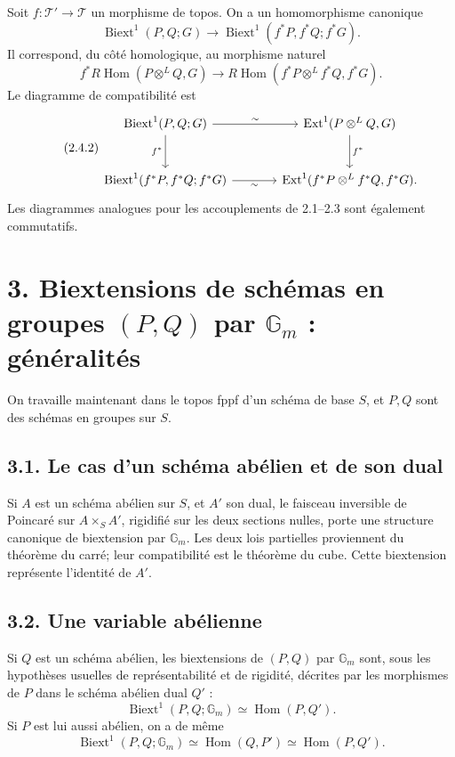 \documentclass[11pt]{article}
\providecommand{\Gm}{\mathbb G_m}
\providecommand{\Hom}{\operatorname{Hom}}
\providecommand{\Ext}{\operatorname{Ext}}
\providecommand{\Biext}{\operatorname{Biext}}
\providecommand{\T}{\mathcal T}
\begin{document}
Soit \(f:\T'\to\T\) un morphisme de topos.  On a un homomorphisme canonique
\begin{equation}\tag{2.4.1}
        \Biext^1(P,Q;G)\longrightarrow
        \Biext^1(f^*P,f^*Q;f^*G).
\end{equation}
Il correspond, du côté homologique, au morphisme naturel
\[
        f^*R\!\Hom(P\otimes^LQ,G)\to
        R\!\Hom(f^*P\otimes^Lf^*Q,f^*G).
\]
Le diagramme de compatibilité est
\begin{equation}\tag{2.4.2}
\begin{tikzcd}[column sep=large,row sep=large]
\Biext^1(P,Q;G)\arrow[r,"\sim"]\arrow[d,"f^*"']&\Ext^1(P\otimes^LQ,G)\arrow[d,"f^*"]\\
\Biext^1(f^*P,f^*Q;f^*G)\arrow[r,"\sim"']&\Ext^1(f^*P\otimes^Lf^*Q,f^*G).
\end{tikzcd}
\end{equation}
Les diagrammes analogues pour les accouplements de 2.1--2.3 sont également commutatifs.

\section*{3. Biextensions de schémas en groupes \((P,Q)\) par \(\Gm\) : généralités}

On travaille maintenant dans le topos fppf d'un schéma de base \(S\), et \(P,Q\) sont des schémas en groupes sur \(S\).

\subsection*{3.1. Le cas d'un schéma abélien et de son dual}

Si \(A\) est un schéma abélien sur \(S\), et \(A'\) son dual, le faisceau inversible de Poincaré sur \(A\times_SA'\), rigidifié sur les deux sections nulles, porte une structure canonique de biextension par \(\Gm\).  Les deux lois partielles proviennent du théorème du carré; leur compatibilité est le théorème du cube.  Cette biextension représente l'identité de \(A'\).

\subsection*{3.2. Une variable abélienne}

Si \(Q\) est un schéma abélien, les biextensions de \((P,Q)\) par \(\Gm\) sont, sous les hypothèses usuelles de représentabilité et de rigidité, décrites par les morphismes de \(P\) dans le schéma abélien dual \(Q'\) :
\begin{equation}\tag{3.2.2}
        \Biext^1(P,Q;\Gm)\simeq \Hom(P,Q').
\end{equation}
Si \(P\) est lui aussi abélien, on a de même
\begin{equation}\tag{3.2.3}
        \Biext^1(P,Q;\Gm)\simeq \Hom(Q,P')\simeq \Hom(P,Q').
\end{equation}
\end{document}
